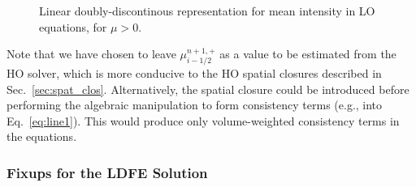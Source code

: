 \begin{figure}[H]
    \centering
    {}
    \caption{Linear doubly-discontinous representation for mean intensity in LO equations,
    for $\mu>0$.}
\label{fig:ld_il}
\end{figure}

Note that we have chosen to leave $\mu_{i-1/2}^{n+1,+}$ as a value to be estimated from the HO solver,
which is more conducive to the HO spatial closures described in
Sec.~\ref{sec:spat_clos}.
Alternatively, the spatial closure could be introduced before performing the algebraic
manipulation to form consistency terms (e.g., into Eq.~\eqref{eq:line1}).  This would produce only volume-weighted consistency
terms in the equations.  


\subsubsection{Fixups for the LDFE Solution}
\label{sec:ldfe_fixups}

